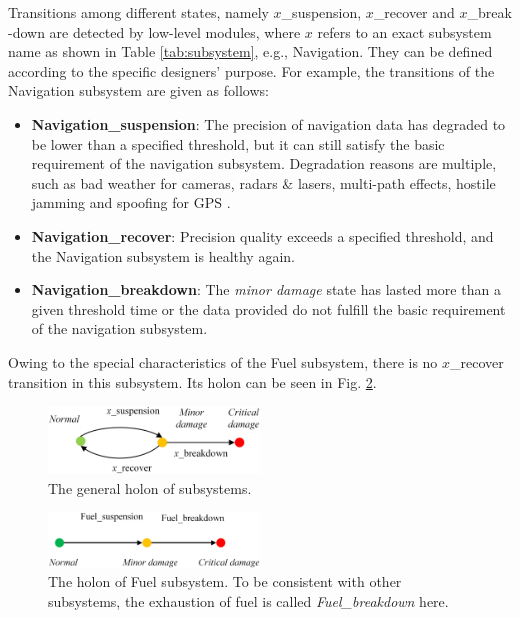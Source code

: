 Transitions among different states, namely $ x $\_suspension, $ x $\_recover and $x$\_break \allowbreak -down are detected by low-level modules, where $ x $ refers to an exact subsystem name as shown in Table \ref{tab:subsystem}, e.g., Navigation. They can be defined according to the specific designers' purpose. For example, the transitions of the Navigation subsystem are given as follows:

\begin{itemize}
	\item \textbf{Navigation\_suspension}: The precision of navigation data has degraded to  be lower than a specified threshold, but it can still satisfy the basic requirement of the navigation subsystem. Degradation reasons are multiple, such as bad weather for cameras, radars \& lasers, multi-path effects, hostile jamming and spoofing for GPS \cite{THOMAS201414}.
	\item \textbf{Navigation\_recover}: Precision quality exceeds a specified threshold, and the Navigation subsystem is healthy again.
	\item \textbf{Navigation\_breakdown}: The \textit{minor damage} state has lasted more than a given threshold time or the data provided do not fulfill the basic requirement of the navigation subsystem.
\end{itemize}

Owing to the special characteristics of the Fuel subsystem, there is no $ x $\_recover transition in this subsystem. Its holon can be seen in Fig. \ref{fig:fuelfailureautomation}.
\begin{figure}[h]
	\begin{center}
		\includegraphics[width=0.5\textwidth]{Figures/Figs_Ch14/Fig9a_GeneralHolon}
		\par\end{center}
	\caption{The general holon of subsystems.}
	\label{fig:failure-automaton} 
\end{figure}

\begin{figure}[h]
	\begin{center}
		\includegraphics[width=0.5\textwidth]{Figures/Figs_Ch14/Fig9b_FuelHolon}
		\par\end{center}
	\caption{The holon of Fuel subsystem. To be consistent with other subsystems, the exhaustion of fuel is called \textit{Fuel\_breakdown} here.}
	\label{fig:fuelfailureautomation} 
\end{figure}	


